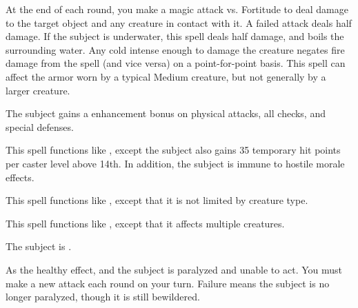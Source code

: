 \spelldur{\durshort \dismissable}
\spelleffect At the end of each round, you make a magic attack vs. Fortitude to deal damage to the target object and any creature in contact with it. A failed attack deals half damage.
\spellnotes If the subject is underwater, this spell deals half damage,  and boils the surrounding water. Any cold intense enough to damage the creature negates fire damage from the spell (and vice versa) on a point-for-point basis. This spell can affect the armor worn by a typical Medium creature, but not generally by a larger creature.

\spelldur{\durshort \dismissable}
\spelleffect The subject gains a  enhancement bonus on physical attacks, all checks, and special defenses. \spellbonusscalingdescription
{}

\spelleffect This spell functions like , except the subject also gains 35 temporary hit points  per caster level above 14th. In addition, the subject is immune to hostile morale effects.

\spelleffect This spell functions like , except that it is not limited by creature type.

\spelleffect This spell functions like , except that it affects multiple creatures.

\begin{spellhealthy}
    The subject is \bewildered.
\end{spellhealthy}
\begin{spellblood}
    As the healthy effect, and the subject is paralyzed and unable to act. You must make a new attack each round on your turn. Failure means the subject is no longer paralyzed, though it is still bewildered.
\end{spellblood}

